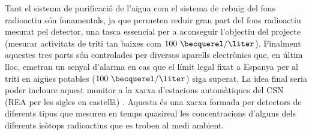 Tant el sistema de purificació de l'aigua com el sistema de rebuig del fons radioactiu són fonamentals, ja que permeten reduir gran part del fons radioactiu mesurat pel detector, una tasca essencial per a aconseguir l'objectiu del projecte (mesurar activitats de triti tan baixes com $100~\becquerel/\liter$). Finalment aquestes tres parts són controlades per diversos aparells electrònics que, en últim lloc, emetran un senyal d'alarma en cas que el límit legal fixat a Espanya per al triti en aigües potables ($100~\becquerel/\liter$) siga superat. La idea final seria poder incloure aquest monitor a la xarxa d'estacions automàtiques del CSN (REA per les sigles en castellà) \cite{REA}. Aquesta és una xarxa formada per detectors de diferents tipus que mesuren en temps quasireal les concentracions d'alguns dels diferents isòtops radioactius que es troben al medi ambient. 